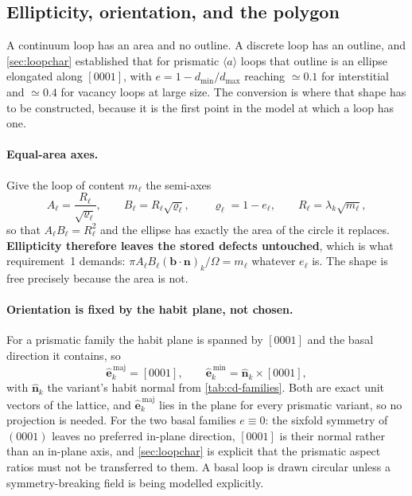 \documentclass{article}
\newcommand{\aloop}{\ensuremath{\langle a\rangle}}
\newcommand{\bvec}{\bm b}
\newcommand{\nvec}{\bm n}
\begin{document}
\subsection{Ellipticity, orientation, and the polygon}
\label{sec:ellipticity-conversion}

A continuum loop has an area and no outline. A discrete loop has an outline, and
\cref{sec:loopchar} established that for prismatic \aloop{} loops that outline is
an ellipse elongated along $[0001]$, with $e=1-d_{\min}/d_{\max}$ reaching
$\simeq0.1$ for interstitial and $\simeq0.4$ for vacancy loops at large size.
The conversion is where that shape has to be constructed, because it is the first
point in the model at which a loop has one.

\paragraph{Equal-area axes.} Give the loop of content $m_\ell$ the semi-axes
\begin{equation}
  A_\ell=\frac{R_\ell}{\sqrt{\varrho_\ell}},
  \qquad
  B_\ell=R_\ell\sqrt{\varrho_\ell},
  \qquad
  \varrho_\ell=1-e_\ell,
  \qquad
  R_\ell=\lambda_k\sqrt{m_\ell},
  \label{eq:ellipseaxes}
\end{equation}
so that $A_\ell B_\ell=R_\ell^2$ and the ellipse has exactly the area of the
circle it replaces. \textbf{Ellipticity therefore leaves the stored defects
untouched}, which is what requirement~1 demands: $\pi
A_\ell B_\ell(\bvec\!\cdot\!\nvec)_k/\Omega=m_\ell$ whatever $e_\ell$ is. The
shape is free precisely because the area is not.

\paragraph{Orientation is fixed by the habit plane, not chosen.} For a prismatic
family the habit plane is spanned by $[0001]$ and the basal direction it
contains, so
\begin{equation}
  \hat{\bm e}^{\,\mathrm{maj}}_k=[0001],
  \qquad
  \hat{\bm e}^{\,\mathrm{min}}_k=\hat{\bm n}_k\times[0001],
  \label{eq:ellipseaxesdir}
\end{equation}
with $\hat{\bm n}_k$ the variant's habit normal from \cref{tab:cd-families}.
Both are exact unit vectors of the lattice, and $\hat{\bm e}^{\,\mathrm{maj}}_k$
lies in the plane for every prismatic variant, so no projection is needed. For
the two basal families $e\equiv0$: the sixfold symmetry of $(0001)$ leaves no
preferred in-plane direction, $[0001]$ is their normal rather than an in-plane
axis, and \cref{sec:loopchar} is explicit that the prismatic aspect ratios must
not be transferred to them. A basal loop is drawn circular unless a
symmetry-breaking field is being modelled explicitly.
\end{document}
